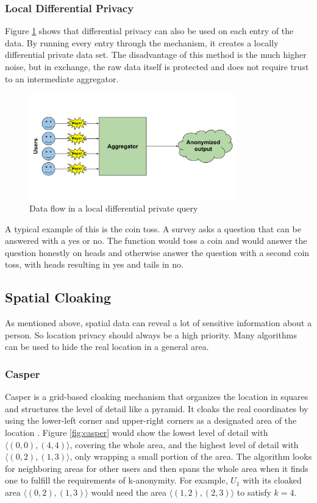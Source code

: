 \subsubsection{Local Differential Privacy}
Figure \ref{fig:local_diff} shows that differential privacy can also be used on each entry of the data. By running every entry through the mechanism, it creates a locally differential private data set. The disadvantage of this method is the much higher noise, but in exchange, the raw data itself is protected and does not require trust to an intermediate aggregator.

\begin{figure}[htpb]
  \centering
  \includegraphics[width=0.8\textwidth]{figures/local_diff.png}
  \caption{Data flow in a local differential private query \cite{desfontaines}} 
  \label{fig:local_diff}
\end{figure}

A typical example of this is the coin toss. A survey asks a question that can be answered with a yes or no. The function would toss a coin and would answer the question honestly on heads and otherwise answer the question with a second coin toss, with heads resulting in yes and tails in no. 

\subsection{Spatial Cloaking}
As mentioned above, spatial data can reveal a lot of sensitive information about a person. So location privacy should always be a high priority. Many algorithms can be used to hide the real location in a general area.

\subsubsection{Casper}
Casper \cite{DBLP:journals/tods/ChowMA09} is a grid-based cloaking mechanism that organizes the location in squares and structures the level of detail like a pyramid. It cloaks the real coordinates by using the lower-left corner and upper-right corners as a designated area of the location \cite{DBLP:conf/ssd/TanLM09}. Figure \ref{fig:casper} would show the lowest level of detail with \(\langle(0,0),(4,4)\rangle\), covering the whole area, and the highest level of detail with \(\langle(0,2),(1,3)\rangle\), only wrapping a small portion of the area. The algorithm looks for neighboring areas for other users and then spans the whole area when it finds one to fulfill the requirements of k-anonymity. For example, \(U_1\) with its cloaked area \(\langle(0,2),(1,3)\rangle\) would need the area \(\langle(1,2),(2,3)\rangle\) to satisfy \(k=4\).

